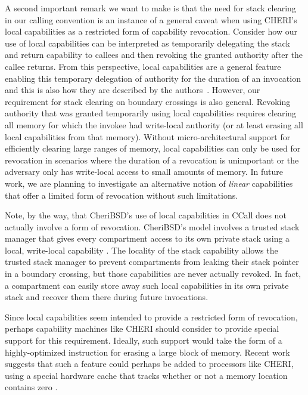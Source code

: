 \documentclass[format=acmsmall, review=true, screen=true]{acmart}
\begin{document}
A second important remark we want to make is that the need for stack clearing in our calling convention is an instance of a general caveat when using CHERI's local capabilities as a restricted form of capability revocation.
Consider how our use of local capabilities can be interpreted as temporarily delegating the stack and return capability to callees and then revoking the granted authority after the callee returns.
From this perspective, local capabilities are a general feature enabling this temporary delegation of authority for the duration of an invocation and this is also how they are described by the authors~\citep{Watson2015Cheri}.
However, our requirement for stack clearing on boundary crossings is also general.
Revoking authority that was granted temporarily using local capabilities requires clearing all memory for which the invokee had write-local authority (or at least erasing all local capabilities from that memory).
Without micro-architectural support for efficiently clearing large ranges of memory, local capabilities can only be used for revocation in scenarios where the duration of a revocation is unimportant or the adversary only has write-local access to small amounts of memory.
In future work, we are planning to investigate an alternative notion of \emph{linear} capabilities that offer a limited form of revocation without such limitations.

Note, by the way, that CheriBSD's use of local capabilities in CCall does not actually involve a form of revocation.
CheriBSD's model involves a trusted stack manager that gives every compartment access to its own private stack using a local, write-local capability \citep{Watson2015Cheri}.
The locality of the stack capability allows the trusted stack manager to prevent compartments from leaking their stack pointer in a boundary crossing, but those capabilities are never actually revoked.
In fact, a compartment can easily store away such local capabilities in its own private stack and recover them there during future invocations.

Since local capabilities seem intended to provide a restricted form of revocation, perhaps capability machines like CHERI should consider to provide special support for this requirement.
Ideally, such support would take the form of a highly-optimized instruction for erasing a large block of memory.
Recent work suggests that such a feature could perhaps be added to processors like CHERI, using a special hardware cache that tracks whether or not a memory location contains zero \citep{Joannou2017EfficientTaggedMemory}.
\end{document}
